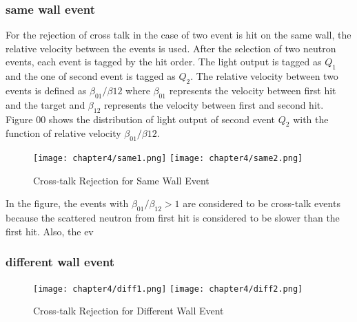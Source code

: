 \subsubsection{same wall event}
For the rejection of cross talk in the case of two event is hit on the same wall, the relative velocity between the events is used. After the selection of two neutron events, each event is tagged by the hit order. The light output is tagged as $Q_1$ and the one of second event is tagged as $Q_2$. The relative velocity between two events is defined as $\beta_{01}/\beta{12}$ where $\beta_{01}$ represents the velocity between first hit and the target and $\beta_{12}$ represents the velocity between first and second hit. Figure 00 shows the distribution of light output of second event $Q_2$ with the function of relative velocity $\beta_{01}/\beta{12}$.
\begin{figure}[h]
    \centering
    \texttt{[image: chapter4/same1.png]}\hspace{0.5cm}
    \texttt{[image: chapter4/same2.png]}
    \caption[Cross-talk Rejection for Same Wall Event]{Cross-talk Rejection for Same Wall Event}
    \label{fig:samewall}
\end{figure}

In the figure, the events with $\beta_{01}/\beta_{12} > 1$ are considered to be cross-talk events because the scattered neutron from first hit is considered to be slower than the first hit. Also, the ev
\subsubsection{different wall event}

\begin{figure}
    \centering
    \texttt{[image: chapter4/diff1.png]}\hspace{0.5cm}
    \texttt{[image: chapter4/diff2.png]}
    \caption[Cross-talk Rejection for Different Wall Event]{Cross-talk Rejection for Different Wall Event}
    \label{fig:differentwall}
\end{figure}

